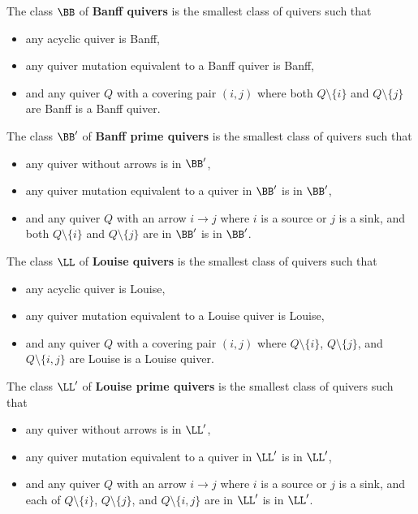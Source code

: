 \begin{defi}\label{def-banff}
    The class $\BB$ of \textbf{Banff quivers} is the smallest class of quivers such that 
    \begin{itemize}
        \item any acyclic quiver is Banff,
        \item any quiver mutation equivalent to a Banff quiver is Banff, 
        \item and any quiver $Q$ with a covering pair $(i,j)$ where both $Q\setminus \{i\}$ and $Q\setminus \{j\}$ are Banff is a Banff quiver.
    \end{itemize}
 \end{defi}

 \begin{defi}\label{def-banffprime}
    The class $\BB'$ of \textbf{Banff prime quivers} is the smallest class of quivers such that
    \begin{itemize}
        \item any quiver without arrows is in $\BB'$,
        \item any quiver mutation equivalent to a quiver in $\BB'$ is in $\BB'$, 
        \item and any quiver $Q$ with an arrow $i \to j$ where $i$ is a source or $j$ is a sink, and both $Q\setminus \{i\}$ and $Q\setminus \{j\}$ are in $\BB'$ is in $\BB'$.
    \end{itemize}
 \end{defi}

 \begin{defi}\label{def-louise}
    The class $\LL$ of \textbf{Louise quivers} is the smallest class of quivers such that 
    \begin{itemize}
        \item any acyclic quiver is Louise,
        \item any quiver mutation equivalent to a Louise quiver is Louise, 
        \item and any quiver $Q$ with a covering pair $(i,j)$ where $Q\setminus \{i\}$, $Q\setminus \{j\}$, and $Q\setminus \{i,j\}$ are Louise is a Louise quiver.
    \end{itemize}
 \end{defi}

 \begin{defi}\label{def-louiseprime}
    The class $\LL'$ of \textbf{Louise prime quivers} is the smallest class of quivers such that 
    \begin{itemize}
        \item any quiver without arrows is in $\LL'$,
        \item any quiver mutation equivalent to a quiver in $\LL'$ is in $\LL'$, 
        \item and any quiver $Q$ with an arrow $i \to j$ where $i$ is a source or $j$ is a sink, and each of $Q\setminus \{i\}$, $Q\setminus \{j\}$, and $Q\setminus \{i,j\}$ are in $\LL'$ is in $\LL'$.
    \end{itemize}
 \end{defi}

